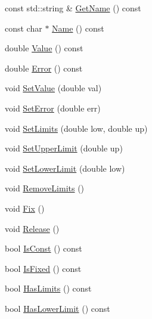 \begin{DoxyCompactItemize}
const std\+::string \& \mbox{\hyperlink{classROOT_1_1Minuit2_1_1MinuitParameter_adc67abcb32783aed362068ee38cb24b7}{Get\+Name}} () const
\item 
const char $\ast$ \mbox{\hyperlink{classROOT_1_1Minuit2_1_1MinuitParameter_a151958b5dbcc194a090753e0b2605fbc}{Name}} () const
\item 
double \mbox{\hyperlink{classROOT_1_1Minuit2_1_1MinuitParameter_ac77aed82006ba9e9598df49a1753d31c}{Value}} () const
\item 
double \mbox{\hyperlink{classROOT_1_1Minuit2_1_1MinuitParameter_af92997a2e9a7209fbddd286bbd1dbc3d}{Error}} () const
\item 
void \mbox{\hyperlink{classROOT_1_1Minuit2_1_1MinuitParameter_a535d59656c70ba8a0cc0ff196bac2d93}{Set\+Value}} (double val)
\item 
void \mbox{\hyperlink{classROOT_1_1Minuit2_1_1MinuitParameter_affa3dbe5755e6345181b98d168722a60}{Set\+Error}} (double err)
\item 
void \mbox{\hyperlink{classROOT_1_1Minuit2_1_1MinuitParameter_aeb1a61d3c007780ec388e11dd39274fc}{Set\+Limits}} (double low, double up)
\item 
void \mbox{\hyperlink{classROOT_1_1Minuit2_1_1MinuitParameter_a9e0c6225558635b19b5d10d0c6d9bb86}{Set\+Upper\+Limit}} (double up)
\item 
void \mbox{\hyperlink{classROOT_1_1Minuit2_1_1MinuitParameter_abf4e64af27e615b90fff7a21e2831488}{Set\+Lower\+Limit}} (double low)
\item 
void \mbox{\hyperlink{classROOT_1_1Minuit2_1_1MinuitParameter_a8c120aa76754c8c8209d0a8c78605137}{Remove\+Limits}} ()
\item 
void \mbox{\hyperlink{classROOT_1_1Minuit2_1_1MinuitParameter_ad0857ffbf012d785401c111cacc79085}{Fix}} ()
\item 
void \mbox{\hyperlink{classROOT_1_1Minuit2_1_1MinuitParameter_a9bf4bb232de53b61fc264c62b44d0b27}{Release}} ()
\item 
bool \mbox{\hyperlink{classROOT_1_1Minuit2_1_1MinuitParameter_afa82fc56a19c43531f469efc1fa34c2c}{Is\+Const}} () const
\item 
bool \mbox{\hyperlink{classROOT_1_1Minuit2_1_1MinuitParameter_a2d7f48ed0d6d1ac124e390e54df4de32}{Is\+Fixed}} () const
\item 
bool \mbox{\hyperlink{classROOT_1_1Minuit2_1_1MinuitParameter_a6319fe000027da162c4adad8782ef27b}{Has\+Limits}} () const
\item 
bool \mbox{\hyperlink{classROOT_1_1Minuit2_1_1MinuitParameter_a61b9c27aff1b1d7bf85bed898dd50dda}{Has\+Lower\+Limit}} () const

\end{DoxyCompactItemize}
